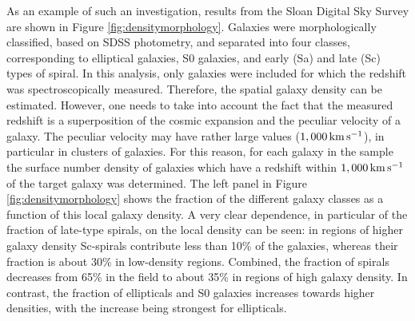 \documentclass[a4paper,11pt]{article}
\begin{document}
{\noindent}As an example of such an investigation, results from the Sloan Digital Sky Survey are shown in Figure \ref{fig:densitymorphology}. Galaxies were morphologically classified, based on SDSS photometry, and separated into four classes, corresponding to elliptical galaxies, S0 galaxies, and early (Sa) and late (Sc) types of spiral. In this analysis, only galaxies were included for which the redshift was spectroscopically measured. Therefore, the spatial galaxy density can be estimated. However, one needs to take into account the fact that the measured redshift is a superposition of the cosmic expansion and the peculiar velocity of a galaxy. The peculiar velocity may have rather large values ($1,000\,{\rm km\,s^{-1}}$), in particular in clusters of galaxies. For this reason, for each galaxy in the sample the surface number density of galaxies which have a redshift within $1,000\,{\rm km\,s^{-1}}$ of the target galaxy was determined. The left panel in Figure \ref{fig:densitymorphology} shows the fraction of the different galaxy classes as a function of this local galaxy density. A very clear dependence, in particular of the fraction of late-type spirals, on the local density can be seen: in regions of higher galaxy density Sc-spirals contribute less than 10\% of the galaxies, whereas their fraction is about 30\% in low-density regions. Combined, the fraction of spirals decreases from 65\% in the field to about 35\% in regions of high galaxy density. In contrast, the fraction of ellipticals and S0 galaxies increases towards higher densities, with the increase being strongest for ellipticals.
\end{document}
